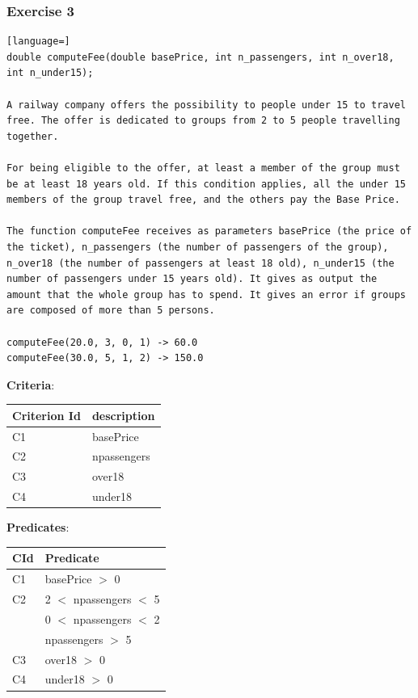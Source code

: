 \documentclass[12pt]{article}
\begin{document}
\subsubsection{Exercise 3}
\begin{lstlisting}[language=]
double computeFee(double basePrice, int n_passengers, int n_over18, int n_under15);

A railway company offers the possibility to people under 15 to travel free. The offer is dedicated to groups from 2 to 5 people travelling together.

For being eligible to the offer, at least a member of the group must be at least 18 years old. If this condition applies, all the under 15 members of the group travel free, and the others pay the Base Price.

The function computeFee receives as parameters basePrice (the price of the ticket), n_passengers (the number of passengers of the group), n_over18 (the number of passengers at least 18 old), n_under15 (the number of passengers under 15 years old). It gives as output the amount that the whole group has to spend. It gives an error if groups are composed of more than 5 persons.

computeFee(20.0, 3, 0, 1) -> 60.0
computeFee(30.0, 5, 1, 2) -> 150.0
\end{lstlisting}
\textbf{Criteria}:
\begin{center}
  \begin{tabular}{|l|l|}
    \hline
    Criterion Id & description \\
    \hline
    C1 & basePrice \\
    \hline
    C2 & npassengers \\
    \hline
    C3 & over18 \\
    \hline
    C4 & under18 \\
    \hline
  \end{tabular}
\end{center}
\textbf{Predicates}:
\begin{center}
  \begin{tabular}{|l|l|}
    \hline
    CId & Predicate \\
    \hline
    C1 & basePrice $>$ 0 \\
    \hline
    C2 & 2 $<$ npassengers $<$ 5 \\
    \hline
    & 0 $<$ npassengers $<$ 2 \\
    \hline
    & npassengers $>$ 5 \\
    \hline
    C3 & over18 $>$ 0 \\
    \hline
    C4 & under18 $>$ 0 \\
    \hline
  \end{tabular}
\end{center}
\end{document}
